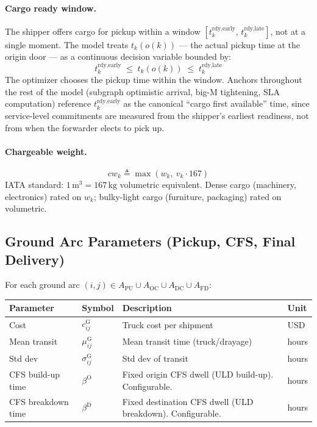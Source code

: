 \documentclass[11pt,a4paper]{article}
\newcommand{\defeq}{\triangleq}
\theoremstyle{definition}
\begin{document}
\paragraph{Cargo ready window.}
The shipper offers cargo for pickup within a window
$[t_k^{\text{rdy,early}},\, t_k^{\text{rdy,late}}]$, not at a single moment. The model
treats $t_k(o(k))$ --- the actual pickup time at the origin door --- as a continuous
decision variable bounded by:
\begin{equation}
  t_k^{\text{rdy,early}} \;\leq\; t_k(o(k)) \;\leq\; t_k^{\text{rdy,late}}
  \label{eq:cargo-ready-window}
\end{equation}
The optimizer chooses the pickup time within the window. Anchors throughout the rest of
the model (subgraph optimistic arrival, big-M tightening, SLA computation) reference
$t_k^{\text{rdy,early}}$ as the canonical ``cargo first available'' time, since
service-level commitments are measured from the shipper's earliest readiness, not from
when the forwarder elects to pick up.

\paragraph{Chargeable weight.}
\begin{equation}
  cw_k \defeq \max\!\left(w_k,\ v_k \cdot 167\right)
  \label{eq:chargeable}
\end{equation}
IATA standard: $1\,\text{m}^3 = 167\,\text{kg}$ volumetric equivalent. Dense cargo (machinery,
electronics) rated on $w_k$; bulky-light cargo (furniture, packaging) rated on volumetric.

\subsection{Ground Arc Parameters (Pickup, CFS, Final Delivery)}
\label{sec:ground-arc-params}

For each ground arc $(i,j) \in A_{\text{PU}} \cup A_{\text{OC}} \cup A_{\text{DC}} \cup A_{\text{FD}}$:

\begin{center}
\begin{tabular}{llp{6.5cm}l}
\toprule
Parameter & Symbol & Description & Unit \\
\midrule
Cost & $c_{ij}^{\text{G}}$ & Truck cost per shipment & USD \\
Mean transit & $\mu_{ij}^{\text{G}}$ & Mean transit time (truck/drayage) & hours \\
Std dev & $\sigma_{ij}^{\text{G}}$ & Std dev of transit & hours \\
CFS build-up time & $\beta^{\text{O}}$ & Fixed origin CFS dwell (ULD build-up). Configurable. & hours \\
CFS breakdown time & $\beta^{\text{D}}$ & Fixed destination CFS dwell (ULD breakdown). Configurable. & hours \\
\bottomrule
\end{tabular}
\end{center}
\end{document}
